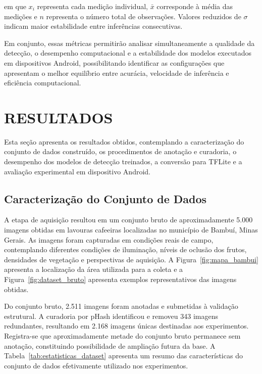 \documentclass[artigo,times,capa]{iftex2024}
\begin{document}
em que $x_i$ representa cada medição individual, $\bar{x}$ corresponde à média das medições e $n$ representa o número total de observações. Valores reduzidos de $\sigma$ indicam maior estabilidade entre inferências consecutivas.

Em conjunto, essas métricas permitirão analisar simultaneamente a qualidade da detecção, o desempenho computacional e a estabilidade dos modelos executados em dispositivos Android, possibilitando identificar as configurações que apresentam o melhor equilíbrio entre acurácia, velocidade de inferência e eficiência computacional.

\section{RESULTADOS}
\label{sec:resultados}

Esta seção apresenta os resultados obtidos, contemplando a caracterização do
conjunto de dados construído, os procedimentos de anotação e curadoria, o
desempenho dos modelos de detecção treinados, a conversão para \ac{TFLite} e a
avaliação experimental em dispositivo Android.

\subsection{Caracterização do Conjunto de Dados}

A etapa de aquisição resultou em um conjunto bruto de aproximadamente 5.000
imagens obtidas em lavouras cafeeiras localizadas no município de Bambuí, Minas
Gerais. As imagens foram capturadas em condições reais de campo, contemplando
diferentes condições de iluminação, níveis de oclusão dos frutos, densidades de
vegetação e perspectivas de aquisição. A Figura~\ref{fig:mapa_bambui} apresenta
a localização da área utilizada para a coleta e a
Figura~\ref{fig:dataset_bruto} apresenta exemplos representativos das imagens
obtidas.

Do conjunto bruto, 2.511 imagens foram anotadas e submetidas à validação
estrutural. A curadoria por pHash identificou e removeu 343 imagens
redundantes, resultando em 2.168 imagens únicas destinadas aos experimentos.
Registra-se que aproximadamente metade do conjunto bruto permanece sem
anotação, constituindo possibilidade de ampliação futura da base. A Tabela~\ref{tab:estatisticas_dataset} apresenta um resumo das características
do conjunto de dados efetivamente utilizado nos experimentos.
\end{document}
